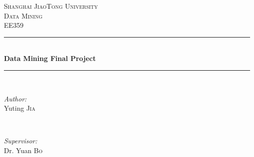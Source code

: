\begin{titlepage}

\newcommand{\HRule}{\rule{\linewidth}{0.5mm}} %

\center %
 

\textsc{\LARGE Shanghai JiaoTong University}\\[1.5cm] %
\textsc{\Large Data Mining}\\[0.5cm] %
\textsc{\large EE359}\\[0.5cm] %


\HRule \\[0.4cm]
{ \huge \bfseries Data Mining Final Project}\\[0.4cm] %
\HRule \\[1.5cm]
 

\begin{minipage}{0.4\textwidth}
\begin{flushleft} \large
\emph{Author:}\\
Yuting \textsc{Jia} %
\end{flushleft}
\end{minipage}
~
\begin{minipage}{0.4\textwidth}
\begin{flushright} \large
\emph{Supervisor:} \\
Dr. Yuan \textsc{Bo} %
\end{flushright}
\end{minipage}\\[2cm]



\end{titlepage}
